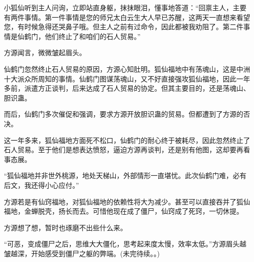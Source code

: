 \begin{this_body}
小狐仙听到主人问询，立即站直身躯，抹抹眼泪，懂事地答道：“回禀主人，主要有两件事情。第一件事情是您的师兄太白云生大人早已苏醒，这两天一直想来看望您，有时候急得还哭鼻子哦。但主人之前有过命令，因此都被我劝阻了。第二件事情是仙鹤门，他们终止了和咱们的石人贸易。”

方源闻言，微微皱起眉头。

仙鹤门忽然终止石人贸易的原因，方源心知肚明。狐仙福地中有荡魂山，这是中洲十大派众所周知的事情。仙鹤门图谋荡魂山，又不好直接强攻狐仙福地，因此一年多前，派遣方正谈判，后来达成了石人贸易的协定。但其主要目的，还是荡魂山、胆识蛊。

而后，仙鹤门多次催促和强调，要求方源开放胆识蛊的贸易。但都遭到了方源的否决。

这一年多来，狐仙福地方面死不松口，仙鹤门的耐心终于被耗尽，因此忽然终止了石人贸易。至于他们是想表达愤怒，逼迫方源再谈判，还是别有他图，这却要再看事态展。

“狐仙福地并非世外桃源，地处天梯山，外部情形一直堪忧。此次仙鹤门难，必有后文，我还得小心应付。”

方源若是有仙窍福地，对狐仙福地的依赖性将大为减少。甚至可以直接吞并了狐仙福地，金蝉脱壳，扬长而去。可惜他现在成了僵尸，仙窍成了死窍，一切休提。

方源想了想，暂时也琢磨不出些什么来。

“可恶，变成僵尸之后，思维大大僵化，思考起来度太慢，效率太低。”方源眉头越皱越深，开始感受到僵尸之躯的弊端。(未完待续。。)

\end{this_body}


